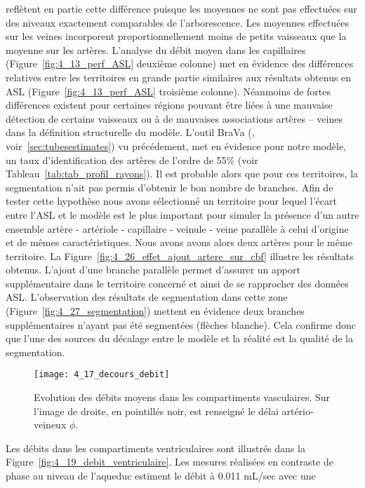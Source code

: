 reflètent en partie cette différence puisque les moyennes ne sont pas effectuées sur des niveaux
exactement comparables de l’arborescence. Les moyennes effectuées sur les veines incorporent
proportionnellement moins de petits vaisseaux que la moyenne sur les artères. L’analyse du débit
moyen dans les capillaires (Figure~\ref{fig:4_13_perf_ASL} deuxième colonne) met en évidence des différences relatives
entre les territoires en grande partie similaires aux résultats obtenus en ASL (Figure~\ref{fig:4_13_perf_ASL} troisième
colonne). Néanmoins de fortes différences existent pour certaines régions pouvant être liées à une mauvaise détection de certains vaisseaux ou à de
mauvaises associations artères – veines dans la définition structurelle du modèle. L'outil BraVa (\cite{Wright2013}, voir~\ref{sec:tubesestimates}) vu précédement, met en évidence pour notre modèle, un taux d'identification des artères de l'ordre de 55\% (voir Tableau~\ref{tab:tab_profil_rayons}). Il est probable alors que pour ces territoires, la segmentation n'ait pas permis d'obtenir le bon nombre de branches. Afin de tester cette hypothèse nous avons sélectionné un territoire pour lequel l'écart entre l'ASL et le modèle est le plus important pour simuler la présence d'un autre ensemble artère - artériole  - capillaire - veinule - veine parallèle à celui d'origine et de mêmes caractéristiques. Nous avons avons alors deux artères pour le même territoire. La Figure~\ref{fig:4_26_effet_ajout_artere_sur_cbf} illustre les résultats obtenus. L'ajout d'une branche parallèle permet d'assurer un apport supplémentaire dans le territoire concerné et ainsi de se rapprocher des données ASL. L'observation des résultats de segmentation dans cette zone (Figure~\ref{fig:4_27_segmentation}) mettent en évidence deux branches supplémentaires n'ayant pas été segmentées (flèches blanche). Cela confirme donc que l'une des sources du décalage entre le modèle et la réalité est la qualité de la segmentation.\\
\begin{figure}[!t]
\centering
\texttt{[image: 4\_17\_decours\_debit]}
\caption{Evolution des débits moyens dans les compartiments vasculaires. Sur l’image de droite, en pointillés noir, est
renseigné le délai artério-veineux $\phi$.}
\label{fig:4_17_decours_debit}	
\end{figure}
Les débits dans les compartiments ventriculaires sont illustrés dans la Figure~\ref{fig:4_19_debit_ventriculaire}. Les mesures
réalisées en contraste de phase au niveau de l’aqueduc estiment le débit à 0.011 mL/sec avec une
